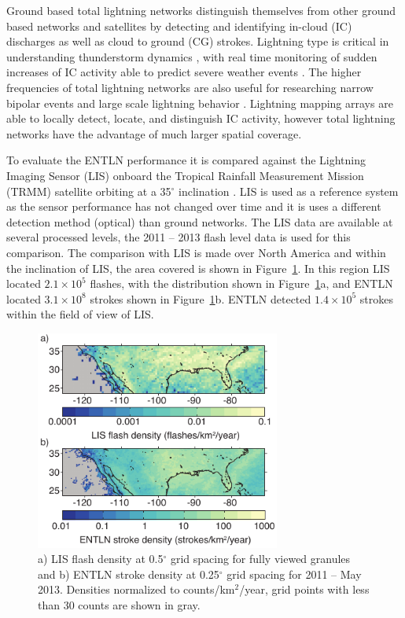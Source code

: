 Ground based total lightning networks distinguish themselves from other ground based networks and satellites by detecting and identifying in-cloud (IC) discharges as well as cloud to ground (CG) strokes.
Lightning type is critical in understanding thunderstorm dynamics \citep{Williams1989}, with real time monitoring of sudden increases of IC activity able to predict severe weather events \citep{Rudlosky2013, Darden2010, Metzger2013, Schultz2009, Schultz2011}.
The higher frequencies of total lightning networks are also useful for researching narrow bipolar events \citep{Suszcynsky2003} and large scale lightning behavior \citep{Hutchins2013}.
Lightning mapping arrays are able to locally detect, locate, and distinguish IC activity, however total lightning networks have the advantage of much larger spatial coverage.

To evaluate the ENTLN performance it is compared against the Lightning Imaging Sensor (LIS) onboard the Tropical Rainfall Measurement Mission (TRMM) satellite orbiting at a 35$^\circ$ inclination \citep{Christian1999}.
LIS is used as a reference system as the sensor performance has not changed over time and it is uses a different detection method (optical) than ground networks. 
The LIS data are available at several processed levels, the 2011 -- 2013 flash level data is used for this comparison.
The comparison with LIS is made over North America and within the inclination of LIS, the area covered is shown in Figure~\ref{entln_lis:fig:density}.
In this region LIS located $2.1\times10^5$ flashes, with the distribution shown in Figure~\ref{entln_lis:fig:density}a, and ENTLN located $3.1\times10^8$ strokes shown in Figure~\ref{entln_lis:fig:density}b.
ENTLN detected $1.4\times10^5$ strokes within the field of view of LIS.

\begin{figure}[t]
   \centering
   \noindent\includegraphics[width=19pc,angle=0]{entln_lis/Figures/density.pdf}
   \caption{a) LIS flash density at 0.5$^\circ$ grid spacing for fully viewed granules and
   		b) ENTLN stroke density at 0.25$^\circ$ grid spacing for 2011 -- May 2013.
   		Densities normalized to counts/km$^2$/year, grid points with less than 30 counts are shown in gray.}
   \label{entln_lis:fig:density}
\end{figure}

